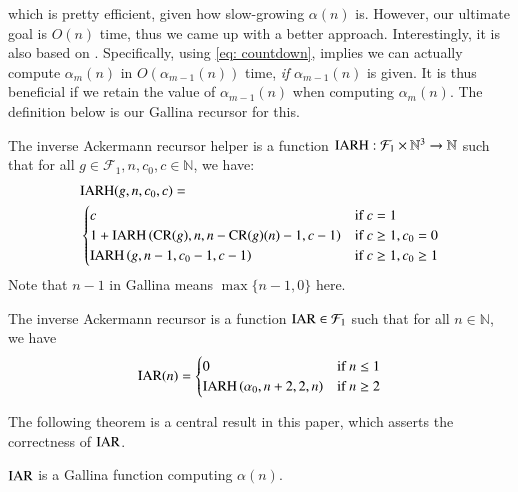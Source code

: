 which is pretty efficient, given how slow-growing 
$\alpha(n)$ is. However, our ultimate goal is $O(n)$ time, 
thus we came up with a better approach. Interestingly, it 
is also based on . 
Specifically, using \eqref{eq: countdown}, 
 implies we can actually 
compute $\alpha_m(n)$ in $O(\alpha_{m-1}(n))$ time, 
\textit{if} $\alpha_{m-1}(n)$ is given. It is thus 
beneficial if we retain the value of $\alpha_{m-1}(n)$ 
when computing $\alpha_m(n)$. The definition below is 
our Gallina recursor for this.

\begin{defn}  \label{defn: inv_ack_recursor_helper}
The inverse Ackermann recursor helper is a function 
$\text{IARH} : \mathcal{F}_1\times \mathbb{N}^3 \to \mathbb{N}$ 
such that for all $g\in \mathcal{F}_1, n, c_0, c\in \mathbb{N}$, we have:
\begin{equation}
\begin{aligned}
& \text{IARH}(g, n, c_0, c) =  \\
& \begin{cases}
c & \text{if } c = 1 \\
1 + \text{IARH}\left(\text{CR}(g), n, n - \text{CR}(g)(n) - 1, c - 1\right) & \text{if } c \ge 1, c_0 = 0 \\
\text{IARH}\left(g, n - 1, c_0 - 1, c - 1\right) & \text{if } c \ge 1, c_0 \ge 1
\end{cases}
\end{aligned}
\end{equation}
Note that $n - 1$ in Gallina means $\max\{n-1, 0\}$ here.
\end{defn}

\begin{defn}  \label{defn: inv_ack_recursor}
The inverse Ackermann recursor is a function 
$\text{IAR} \in \mathcal{F}_1$ such that for all $n\in \mathbb{N}$, 
we have
\begin{equation}
\text{IAR}(n) = \begin{cases}
0 & \text{if } n \le 1 \\ \text{IARH}\left(\alpha_0, n + 2, 2, n\right) & \text{if } n\ge 2
\end{cases}
\end{equation}
\end{defn}

The following theorem is a central result in this paper, 
which asserts the correctness of $\text{IAR}$.

\begin{thm} \label{thm: inv_ack_correct}
$\text{IAR}$ is a Gallina function computing $\alpha(n)$.
\end{thm}

